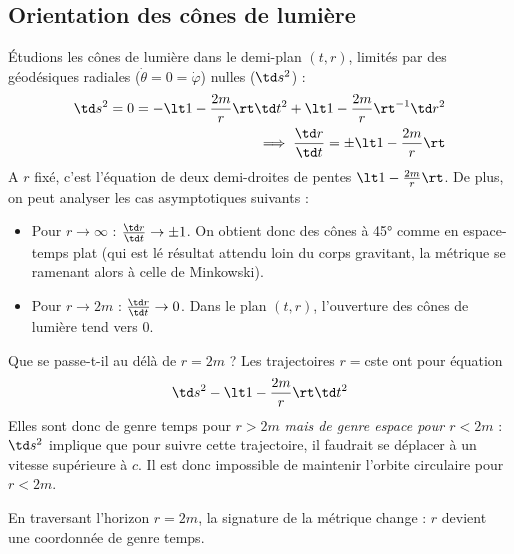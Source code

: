 \subsection{Orientation des cônes de lumière}
Étudions les cônes de lumière dans le demi-plan $(t,r)$, limités par des géodésiques radiales ($\dot{\theta} = 0 = \dot{\varphi}$) nulles ($\td s^2$) :
\begin{align}
    \td s^2 = 0 = - \lt 1 - \frac{2m}{r} \rt \td t^2 + \lt 1 - \frac{2m}{r} \rt^{-1} \td r^2\\
    \label{eq:géodésiques radiales nulles}
    \implies \frac{\td r}{\td t} = \pm \lt 1-\frac{2m}{r} \rt
\end{align}
A $r$ fixé, c'est l'équation de deux demi-droites de pentes $\lt 1- \frac{2m}{r}\rt$. De plus, on peut analyser les cas asymptotiques suivants :
\begin{itemize}
    \item Pour $r\to \infty$ : $\frac{\td r}{\td t} \to \pm 1$. On obtient donc des cônes à 45° comme en espace-temps plat (qui est lé résultat attendu loin du corps gravitant, la métrique se ramenant alors à celle de Minkowski).
    \item Pour $r \to 2m$ : $\frac{\td r}{\td t} \to 0$. Dans le plan $(t,r)$, l'ouverture des cônes de lumière tend vers $0$.
\end{itemize}
Que se passe-t-il au délà de $r = 2m$ ? Les trajectoires $r = $cste ont pour équation 
\begin{equation}
    \td s^2 - \lt 1 - \frac{2m}{r} \rt \td t^2
\end{equation}
Elles sont donc de genre temps pour $r>2m$ \emph{mais de genre espace pour $r<2m$} : $\td s^2$ implique que pour suivre cette trajectoire, il faudrait se déplacer à un vitesse supérieure à $c$. Il est donc impossible de maintenir l'orbite circulaire pour $r<2m$.
\begin{rmk}
    En traversant l'horizon $r=2m$, la signature de la métrique change : $r$ devient une coordonnée de genre temps.
\end{rmk}
